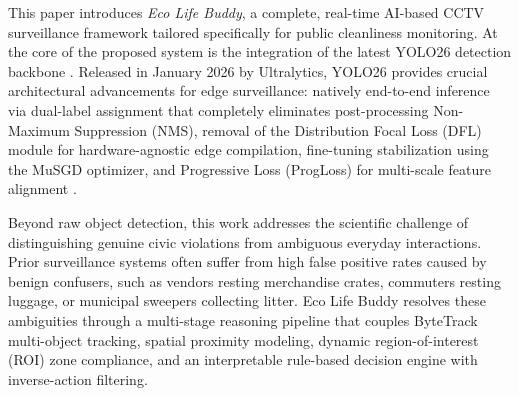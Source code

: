 \documentclass[conference]{IEEEtran}
\begin{document}
This paper introduces \textit{Eco Life Buddy}, a complete, real-time AI-based CCTV surveillance framework tailored specifically for public cleanliness monitoring. At the core of the proposed system is the integration of the latest YOLO26 detection backbone \cite{b3}. Released in January 2026 by Ultralytics, YOLO26 provides crucial architectural advancements for edge surveillance: natively end-to-end inference via dual-label assignment that completely eliminates post-processing Non-Maximum Suppression (NMS), removal of the Distribution Focal Loss (DFL) module for hardware-agnostic edge compilation, fine-tuning stabilization using the MuSGD optimizer, and Progressive Loss (ProgLoss) for multi-scale feature alignment \cite{b3}.

Beyond raw object detection, this work addresses the scientific challenge of distinguishing genuine civic violations from ambiguous everyday interactions. Prior surveillance systems often suffer from high false positive rates caused by benign confusers, such as vendors resting merchandise crates, commuters resting luggage, or municipal sweepers collecting litter. Eco Life Buddy resolves these ambiguities through a multi-stage reasoning pipeline that couples ByteTrack multi-object tracking, spatial proximity modeling, dynamic region-of-interest (ROI) zone compliance, and an interpretable rule-based decision engine with inverse-action filtering.
\end{document}
